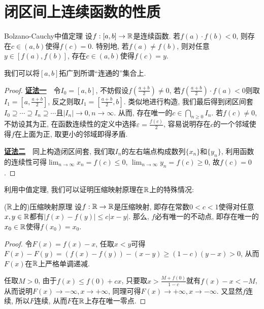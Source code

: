 \section{闭区间上连续函数的性质}

\begin{theorem}{Bolzano-Cauchy中值定理}
	设$f:[a,b] \to \mathbb{R}$是连续函数. 若$f(a) \cdot f(b) <0$, 则存在$c \in (a,b)$使得$f(c)=0$. 特别地, 若$f(a) \neq f(b)$, 则对任意$y \in [f(a),f(b)]$, 存在$c \in (a,b)$使得$f(c)=y$. 
\end{theorem}
\begin{remark}
	我们可以将$[a,b]$拓广到所谓“连通的”集合上. 
\end{remark}
\begin{proof}
	\underline{\textbf{证法一}}~~令$I_0=[a,b]$, 不妨假设$f(\frac{a+b}{2}) \neq 0$, 若$f(\frac{a+b}{2}) \cdot f(a)<0$则取$I_1=[a,\frac{a+b}{2}]$, 反之则取$I_1=[\frac{a+b}{2},b]$. 类似地进行构造, 我们最后得到闭区间套$I_0 \supseteq \cdots \supseteq I_n \supseteq \cdots$且$|I_n|\to 0,n \to \infty$. 从而, 存在唯一的$c \in \bigcap_{n\geq 0}I_n$. 若$f(c) \neq 0$, 不妨设其为正, 在函数连续性的定义中选择$\varepsilon = \frac{f(c)}{2}$, 容易说明存在$c$的一个邻域使得$f$在上面为正, 取更小的邻域即得矛盾. 
	
	\underline{\textbf{证法二}}~~同上构造闭区间套, 我们取$I_n$的左右端点构成数列$\{ x_n \}$和$\{ y_n \}$, 利用函数的连续性可得$\lim_{n\to \infty} x_n = f(c) \leq 0$, $\lim_{n\to \infty} y_n = f(c) \geq 0$, 故$f(c)=0$. 
\end{proof}

利用中值定理, 我们可以证明压缩映射原理在$\mathbb{R}$上的特殊情况: 

\begin{proposition}{($\mathbb{R}$上的)压缩映射原理}
	设$f:\mathbb{R} \to \mathbb{R}$是压缩映射, 即存在常数$0 < c < 1$使得对任意$x,y \in \mathbb{R}$都有$|f(x)-f(y)| \leq c|x-y|$. 那么, $f$必有唯一的不动点, 即存在唯一的$x_0 \in \mathbb{R}$使得$f(x_0)=x_0$. 
\end{proposition}
\begin{proof}
	令$F(x) = f(x) - x$, 任取$x<y$可得$F(x)-F(y) = (f(x)-f(y)) - (x-y) \geq (1-c)(y-x) >0$, 从而$F(x)$在$\mathbb{R}$上严格单调递减. 
	
	任取$M>0$, 由于$f(x) \leq f(0)+cx$, 只要取$x > \frac{M+f(0)}{1-c}$就有$f(x)-x<-M$, 从而说明$F(x) \to -\infty ,x \to +\infty$, 同理可得$F(x) \to +\infty ,x \to -\infty$. 又显然$f$连续, 所以$F$连续, 从而$F$在$\mathbb{R}$上存在唯一零点. 
\end{proof}


